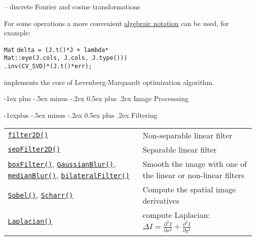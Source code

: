 \documentclass[10pt,landscape]{article}
\makeatletter
\renewcommand{\section}{\@startsection{section}{1}{0mm}%
                                {-1ex plus -.5ex minus -.2ex}%
                                {0.5ex plus .2ex}%
                                {\normalfont\large\bfseries}}
\renewcommand{\subsection}{\@startsection{subsection}{2}{0mm}%
                                {-1explus -.5ex minus -.2ex}%
                                {0.5ex plus .2ex}%
                                {\normalfont\normalsize\bfseries}}
\makeatother
\begin{document}
\begin{multicols}{3}
\begin{itemize}
-- discrete Fourier and cosine transformations 

\end{itemize}

For some operations a more convenient \href{http://opencv.willowgarage.com/documentation/cpp/core_basic_structures.html#matrix-expressions}{algebraic notation} can be used, for example:
\begin{tabbing}
\texttt{Mat}\={} \texttt{delta = (J.t()*J + lambda*}\\
\>\texttt{Mat::eye(J.cols, J.cols, J.type()))}\\
\>\texttt{.inv(CV\_SVD)*(J.t()*err);}
\end{tabbing}
implements the core of Levenberg-Marquardt optimization algorithm.

\section{Image Processsing}

\subsection{Filtering}

\begin{tabular}{@{}p{\the\MyLen}%
                @{}p{\linewidth-\the\MyLen}@{}}
\texttt{\href{http://opencv.willowgarage.com/documentation/cpp/imgproc_image_filtering.html\#cv-filter2d}{filter2D()}} & Non-separable linear filter \\

\texttt{\href{http://opencv.willowgarage.com/documentation/cpp/imgproc_image_filtering.html\#cv-sepfilter2d}{sepFilter2D()}} & Separable linear filter \\

\texttt{\href{http://opencv.willowgarage.com/documentation/cpp/imgproc_image_filtering.html\#cv-blur}{boxFilter()}},  \texttt{\href{http://opencv.willowgarage.com/documentation/cpp/imgproc_image_filtering.html\#cv-gaussianblur}{GaussianBlur()}},
\texttt{\href{http://opencv.willowgarage.com/documentation/cpp/imgproc_image_filtering.html\#cv-medianblur}{medianBlur()}},
\texttt{\href{http://opencv.willowgarage.com/documentation/cpp/imgproc_image_filtering.html\#cv-bilateralfilter}{bilateralFilter()}}
& Smooth the image with one of the linear or non-linear filters \\

\texttt{\href{http://opencv.willowgarage.com/documentation/cpp/imgproc_image_filtering.html\#cv-sobel}{Sobel()}},  \texttt{\href{http://opencv.willowgarage.com/documentation/cpp/imgproc_image_filtering.html\#cv-scharr}{Scharr()}}
& Compute the spatial image derivatives \\
\texttt{\href{http://opencv.willowgarage.com/documentation/cpp/imgproc_image_filtering.html\#cv-laplacian}{Laplacian()}} & compute Laplacian: $\Delta I = \frac{\partial ^ 2 I}{\partial x^2} + \frac{\partial ^ 2 I}{\partial y^2}$  \\


\end{tabular}
\end{multicols}
\end{document}
